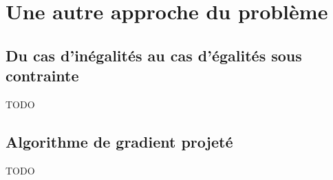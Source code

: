 \documentclass[10pt,a4paper]{article}
\begin{document}
\section{Une autre approche du problème}

\subsection{Du cas d'inégalités au cas d'égalités sous contrainte}
TODO

\subsection{Algorithme de gradient projeté}
TODO
\end{document}
